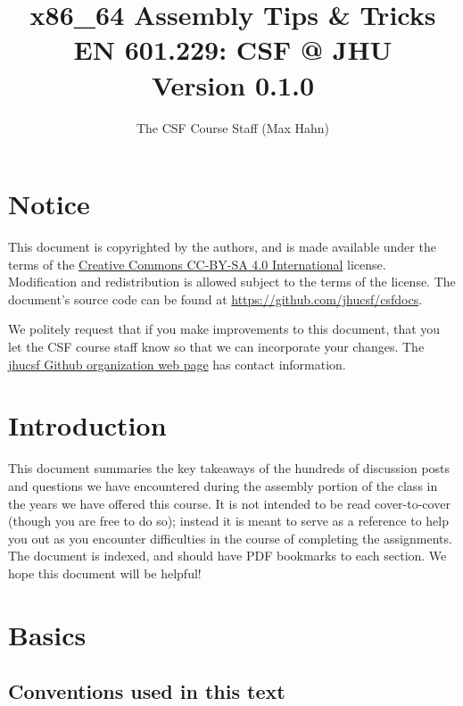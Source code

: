 \documentclass[11pt]{article}
\begin{document}
\title{x86\_64 Assembly Tips \& Tricks \\
\large EN 601.229: CSF @ JHU\\
Version 0.1.0}
\author{The CSF Course Staff (Max Hahn)}
\maketitle

\tableofcontents
\newpage

\section{Notice}

This document is copyrighted by the authors, and is
made available under the terms of the
\href{https://creativecommons.org/licenses/by-sa/4.0/}{Creative Commons CC-BY-SA 4.0 International}
license. Modification and redistribution is allowed subject to the terms
of the license. The document's source code can be found at
\url{https://github.com/jhucsf/csfdocs}.

We politely request that if you make improvements to this document,
that you let the CSF course staff know so that we can incorporate your
changes. The \href{https://github.com/jhucsf}{jhucsf Github organization web page}
has contact information.

\newpage

\section{Introduction}

This document summaries the key takeaways of the hundreds of discussion posts and questions we
have encountered during the assembly portion of the class in the years we have offered
this course. It is not intended to be read cover-to-cover (though you are free to do so);
instead it is meant to serve as a reference to help you out as you encounter difficulties
in the course of completing the assignments. The document is indexed, and should have PDF
bookmarks to each section. We hope this document will be helpful!

\section{Basics}

\subsection{Conventions used in this text}
\end{document}
